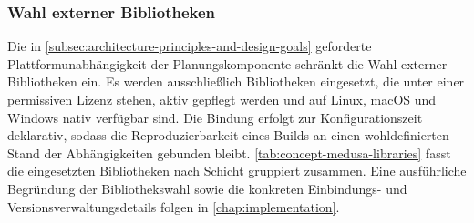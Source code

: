             \subsubsection{Wahl externer Bibliotheken}\label{subsubsec:concept-medusa-external-libraries} 
                Die in \cref{subsec:architecture-principles-and-design-goals} geforderte Plattformunabhängigkeit der Planungskomponente schränkt die Wahl externer Bibliotheken ein.
                Es werden ausschließlich Bibliotheken eingesetzt, die unter einer permissiven Lizenz stehen, aktiv gepflegt werden und auf Linux, macOS und Windows nativ verfügbar sind.
                Die Bindung erfolgt zur Konfigurationszeit deklarativ, sodass die Reproduzierbarkeit eines Builds an einen wohldefinierten Stand der Abhängigkeiten gebunden bleibt.
                \cref{tab:concept-medusa-libraries} fasst die eingesetzten Bibliotheken nach Schicht gruppiert zusammen.
                Eine ausführliche Begründung der Bibliothekswahl sowie die konkreten Einbindungs- und Versionsverwaltungsdetails folgen in \cref{chap:implementation}.

